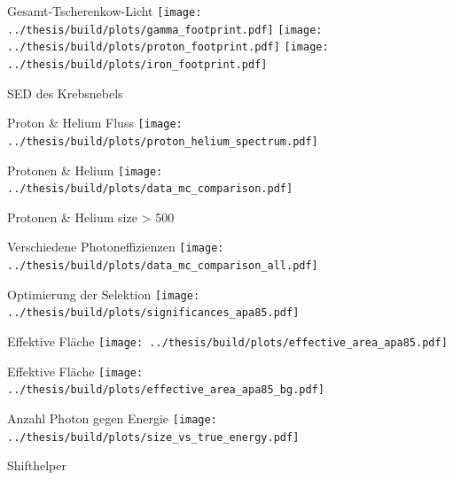 \documentclass[aspectratio=1610, 9pt]{beamer}
\begin{document}
\begin{frame}[c]{Gesamt-Tscherenkow-Licht}%
  \texttt{[image: ../thesis/build/plots/gamma\_footprint.pdf]}%
  \texttt{[image: ../thesis/build/plots/proton\_footprint.pdf]}%
  \texttt{[image: ../thesis/build/plots/iron\_footprint.pdf]}%
\end{frame}%


\begin{frame}[c]{SED des Krebsnebels}
  \centering
  \resizebox{!}{.9\textheight}{
    
  }
\end{frame}

\begin{frame}[t]{Proton \& Helium Fluss}
  \centering
  \texttt{[image: ../thesis/build/plots/proton\_helium\_spectrum.pdf]}
\end{frame}


\begin{frame}{Protonen \& Helium}
  \texttt{[image: ../thesis/build/plots/data\_mc\_comparison.pdf]}
\end{frame}

\begin{frame}{Protonen \& Helium size > 500}
\end{frame}

\begin{frame}[c]{Verschiedene Photoneffizienzen}
  \texttt{[image: ../thesis/build/plots/data\_mc\_comparison\_all.pdf]}
\end{frame}

\begin{frame}[c]{Optimierung der Selektion}
  \centering
  \texttt{[image: ../thesis/build/plots/significances\_apa85.pdf]}%
\end{frame}

\begin{frame}[c]{Effektive Fläche}
  \centering
  \texttt{[image: ../thesis/build/plots/effective\_area\_apa85.pdf]}
\end{frame}

\begin{frame}[c]{Effektive Fläche}
  \centering
  \texttt{[image: ../thesis/build/plots/effective\_area\_apa85\_bg.pdf]}
\end{frame}


\begin{frame}[c]{Anzahl Photon gegen Energie}
  \centering
  \texttt{[image: ../thesis/build/plots/size\_vs\_true\_energy.pdf]}
\end{frame}


\begin{frame}[c]{Shifthelper}
  \centering
  \begin{tikzpicture}
    
  \end{tikzpicture}
\end{frame}
\end{document}
